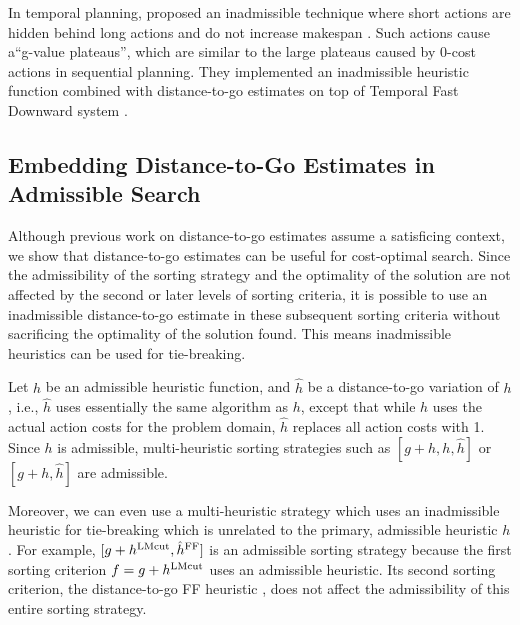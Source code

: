 In temporal planning,  proposed an inadmissible technique where short actions are
hidden behind long actions and do not increase makespan \cite{benton2010g}. Such actions cause a``g-value
plateaus'', which are similar to the large plateaus caused by 0-cost actions in sequential planning.  They implemented an inadmissible
heuristic function combined with distance-to-go estimates on top of Temporal Fast Downward system
\cite{eyerich2009using}.  %


\subsection{Embedding Distance-to-Go Estimates in Admissible Search}

Although previous work on distance-to-go estimates assume a satisficing context,
we show that distance-to-go estimates can be useful for cost-optimal search.
Since the admissibility of the sorting strategy and the optimality of the solution are not affected by the
second or later levels of sorting criteria, it is possible to use an inadmissible distance-to-go estimate
in these subsequent sorting criteria without sacrificing the optimality of the solution found.
This means inadmissible heuristics can be used for tie-breaking.


Let $h$ be an admissible heuristic function, and
$\hat{h}$ be a distance-to-go variation of $h$, i.e., $\hat{h}$ uses essentially the same algorithm as $h$, except that while $h$ uses the actual action costs for the problem domain, $\hat{h}$ replaces all action costs with 1.
Since $h$ is admissible, multi-heuristic sorting strategies such as $[g+h,h,\hat{h}]$ or $[g+h,\hat{h}]$
are admissible.

Moreover, we can even use a multi-heuristic strategy which uses an inadmissible heuristic for tie-breaking which is unrelated to the primary, admissible heuristic $h$.
 For example, $[g+h^{\text{LMcut}},\hat{h}^{\text{FF}}]$ is an admissible sorting strategy
because the first sorting criterion $f=g+h^{\text{LMcut}}$ uses an admissible
\lmcut heuristic. Its second sorting criterion, the distance-to-go FF
heuristic \cite{Hoffmann01}, does not affect the admissibility of this entire sorting strategy.


